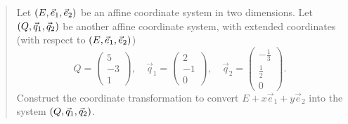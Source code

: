 \documentclass[english]{exercise}
\begin{document}
    \begin{quote}
        Let \(\parentheses*{E, \vec{e}_1, \vec{e}_2}\) be an affine coordinate system in two dimensions.
        Let \(\parentheses*{Q, \vec{q}_1, \vec{q}_2}\) be another affine coordinate system, with extended coordinates (with respect to \(\parentheses*{E, \vec{e}_1, \vec{e}_2}\))
        \[
            Q = \begin{pmatrix}
                5\\
                -3\\
                1
            \end{pmatrix}, \quad \vec{q}_1 = \begin{pmatrix}
                2\\
                -1\\
                0
            \end{pmatrix}, \quad \vec{q}_2 = \begin{pmatrix}
                -\frac{1}{3}\\
                \frac{1}{2}\\
                0
            \end{pmatrix}.
        \]
        Construct the coordinate transformation to convert \(E + x\vec{e}_1 + y\vec{e}_2\) into the system \(\parentheses*{Q, \vec{q}_1, \vec{q}_2}\).
    \end{quote}
\end{document}
